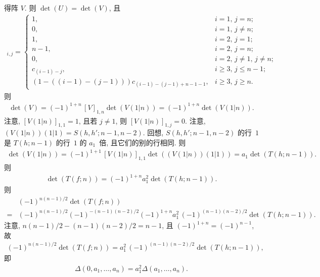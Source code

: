 \documentclass[../libro.tex]{subfiles}
\begin{document}
\begin{example}
    得阵 \(V\).
    则 \(\det {(U)} = \det {(V)}\),
    且
    \begin{align*}
        [V]_{i,j} =
        \begin{cases}
            1,
            & \text{\(i = 1\), \(j = n\)}; \\
            0,
            & \text{\(i = 1\), \(j \neq n\)}; \\
            1,
            & \text{\(i = 2\), \(j = 1\)}; \\
            n-1,
            & \text{\(i = 2\), \(j = n\)}; \\
            0,
            & \text{\(i = 2\), \(j \neq 1\), \(j \neq n\)}; \\
            c_{(i-1)-j},
            & \text{\(i \geq 3\), \(j \leq n-1\)}; \\
            (1 - ((i-1) - (j-1))) c_{(i-1)-(j-1)+n-1-1},
            & \text{\(i \geq 3\), \(j \geq n\)}.
        \end{cases}
    \end{align*}
    则
    \begin{align*}
        \det {(V)}
        = (-1)^{1+n} \, [V]_{1,n} \det {(V(1|n))}
        = (-1)^{1+n} \det {(V(1|n))}.
    \end{align*}
    注意, \([V(1|n)]_{1,1} = 1\),
    且若 \(j \neq 1\),
    则 \([V(1|n)]_{1,j} = 0\).
    注意, \((V(1|n))(1|1) = S(h, h'; n-1, n-2)\).
    回想, \(S(h, h'; n-1, n-2)\) 的行~\(1\)
    是 \(T(h; n-1)\) 的行~\(1\) 的 \(a_1\)~倍,
    且它们的别的行相同.
    则
    \begin{align*}
        \det {(V(1|n))}
        = (-1)^{1+1} \, [V(1|n)]_{1,1}
        \det {((V(1|n))(1|1))}
        = a_1 \det {(T(h; n-1))}.
    \end{align*}
    则
    \begin{align*}
        \det {(T(f; n))}
        = (-1)^{1+n} a_1^2 \det {(T(h; n-1))}.
    \end{align*}
    则
    \begin{align*}
        &
        (-1)^{n(n-1)/2} \det {(T(f; n))}
        \\
        = {} &
        (-1)^{n(n-1)/2} (-1)^{-(n-1)(n-2)/2} (-1)^{1+n}
        a_1^2\, (-1)^{(n-1)(n-2)/2} \det {(T(h; n-1))}.
    \end{align*}
    注意, \(n(n-1)/2 - (n-1)(n-2)/2 = n-1\),
    且 \((-1)^{1+n} = (-1)^{n-1}\),
    故
    \begin{align*}
        (-1)^{n(n-1)/2} \det {(T(f; n))}
        = a_1^2\, (-1)^{(n-1)(n-2)/2} \det {(T(h; n-1))},
    \end{align*}
    即
    \begin{align*}
        \Delta (0, a_1, \dots, a_n)
        = a_1^2 \Delta (a_1, \dots, a_n).
    \end{align*}


\end{example}
\end{document}
